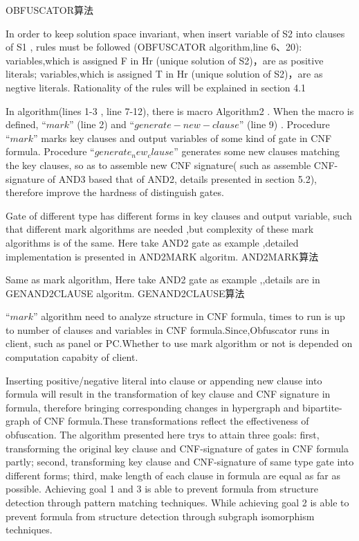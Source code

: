 \documentclass[runningheads,a4paper]{llncs}
\begin{document}
OBFUSCATOR算法

In order to keep solution space invariant, when insert variable of S2 into clauses of S1 , rules must be followed (OBFUSCATOR algorithm,line 6、20): variables,which is assigned F in Hr (unique solution of S2)，are as positive literals; variables,which is assigned T in Hr (unique solution of S2)，are as negtive literals. Rationality of the rules will be explained in section 4.1

In algorithm(lines 1-3 , line 7-12), there is macro Algorithm2 . When the macro is defined, $“mark”$ (line 2) and $“generate-new-clause”$ (line 9) . Procedure $“mark”$ marks key clauses and output variables of some kind of gate in CNF formula. Procedure $“generate_new_clause”$ generates some new clauses matching the key clauses, so as to  assemble new CNF signature( such as assemble CNF-signature of AND3 based that of AND2, details presented in section 5.2), therefore improve the hardness of distinguish gates.

Gate of different type has different forms in key clauses and output variable, such that different mark algorithms are needed ,but complexity of these mark algorithms is of the same. Here take AND2 gate as example ,detailed implementation is presented in AND2MARK algoritm.  
AND2MARK算法

Same as mark algorithm, Here take AND2 gate as example ,,details are in GENAND2CLAUSE algoritm.
GENAND2CLAUSE算法

$“mark”$ algorithm need to analyze structure in CNF formula, times to run is up to number of clauses and variables in CNF formula.Since,Obfuscator runs in client, such as panel or PC.Whether to use mark algorithm or not is depended on computation capabity of client.

Inserting positive/negative literal into clause or appending new clause into formula will result in the transformation of key clause and CNF signature in formula, therefore bringing corresponding changes in hypergraph and bipartite-graph of CNF formula.These transformations reflect the effectiveness of obfuscation. The algorithm presented here trys to attain three goals: first, transforming the original key clause and CNF-signature of gates in CNF formula partly; second, transforming key clause and CNF-signature of same type gate into different forms; third, make length of each clause in formula are equal as far as possible. Achieving goal 1 and 3 is able to prevent formula from structure detection through pattern matching techniques. While achieving goal 2 is able to prevent formula from structure detection through subgraph isomorphism techniques. 
\end{document}
